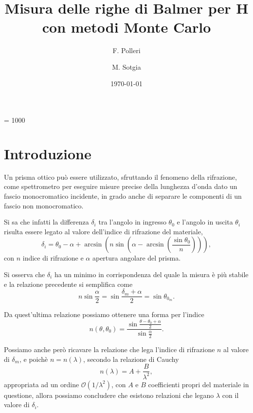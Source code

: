 \documentclass[a4paper,aps,12pt,tightenlines]{revtex4-2}
\begin{document}
\count\footins = 1000
\title{Misura delle righe di Balmer per H con metodi Monte Carlo}
\author{F. Polleri}
\author{M. Sotgia}
\date{\today}
\maketitle

\section{Introduzione}
Un prisma ottico può essere utilizzato, sfruttando il fenomeno della rifrazione, come spettrometro per eseguire misure precise della lunghezza d'onda dato un fascio monocromatico incidente, in grado anche di separare le componenti di un fascio non monocromatico. 

Si sa che infatti la differenza $\delta_i$ tra l'angolo in ingresso $\theta_0$ e l'angolo in uscita $\theta_i$ risulta essere legato al valore dell'indice di rifrazione del materiale, \begin{equation}\delta_i = \theta_0 - \alpha+\arcsin\left(n\sin\left(\alpha - \arcsin\left(\frac{\sin\theta_0}{n}\right)\right)\right),\end{equation} con $n$ indice di rifrazione e $\alpha$ apertura angolare del prisma. 

Si osserva che $\delta_i$ ha un minimo in corrispondenza del quale la misura è più stabile e la relazione precedente si semplifica come \begin{equation} n\sin\frac{\alpha}{2} = \sin\frac{\delta_m + \alpha}{2} = \sin\theta_{0_m}.\end{equation}

Da quest'ultima relazione possiamo ottenere una forma per l'indice \begin{equation} n(\theta, \theta_0) = \frac{\sin\frac{\theta-\theta_0 + \alpha}{2}}{\sin\frac{\alpha}{2}}.\label{eq:nthth0}\end{equation}

Possiamo anche però ricavare la relazione che lega l'indice di rifrazione $n$ al valore di $\delta_m$, e poichè $n=n(\lambda)$, secondo la relazione di Cauchy \begin{equation} n(\lambda) = A + \frac{B}{\lambda^2},\end{equation} appropriata ad un ordine $\mathcal O (1/\lambda^2)$, con $A$ e $B$ coefficienti propri del materiale in questione, allora possiamo concludere che esistono relazioni che legano $\lambda$ con il valore di $\delta_i$. 
\end{document}

